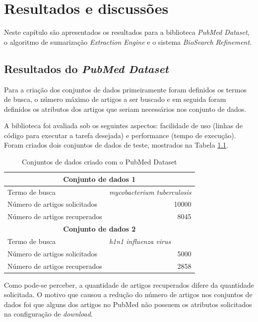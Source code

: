 \chapter{Resultados e discussões}

Neste capítulo são apresentados os resultados para a biblioteca \emph{PubMed Dataset}, o algoritmo de sumarização \emph{Extraction Engine} e o sistema \emph{BioSearch Refinement}. 

\section{Resultados do \emph{PubMed Dataset}}
Para a criação dos conjuntos de dados primeiramente foram definidos os termos de busca, o
número máximo de artigos a ser buscado e em seguida foram definidos os atributos dos artigos
que seriam necessários nos conjunto de dados.

A biblioteca foi avaliada sob os seguintes aspectos: facilidade de uso (linhas de código para executar a tarefa desejada) e performance (tempo de execução). Foram criados dois conjuntos de dados de teste, mostrados na Tabela \ref{tab:datasets}.


\begin{table}[htbp]
\center
\begin{tabular}{|l|l|}
\hline
\multicolumn{ 2}{|c|}{\textbf{Conjunto de dados 1}} \\ \hline
Termo de busca & \textit{mycobacterium tuberculosis} \\ \hline
Número de artigos solicitados & \multicolumn{1}{r|}{10000} \\ \hline
Número de artigos recuperados & \multicolumn{1}{r|}{8045} \\ \hline
\multicolumn{ 2}{|c|}{\textbf{Conjunto de dados 2}} \\ \hline
Termo de busca & \textit{h1n1 influenza virus} \\ \hline
Número de artigos solicitados & \multicolumn{1}{r|}{5000} \\ \hline
Número de artigos recuperados & \multicolumn{1}{r|}{2858} \\ \hline
\end{tabular}
\caption{Conjuntos de dados criado com o PubMed Dataset}
\label{tab:datasets}
\end{table}

Como pode-se perceber, a quantidade de artigos recuperados difere da quantidade solicitada. O motivo que causou a redução do número de artigos nos conjuntos de dados foi que alguns dos artigos no PubMed não possuem os atributos solicitados na configuração de \emph{download}. 

